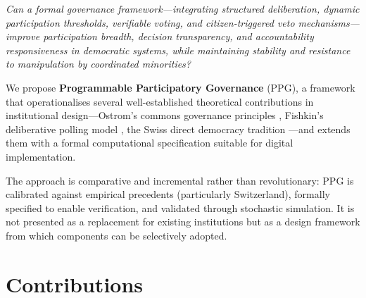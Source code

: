 \documentclass[12pt,a4paper,oneside]{report}
\begin{document}
\begin{mdframed}
\textit{Can a formal governance framework---integrating structured deliberation, dynamic participation thresholds, verifiable voting, and citizen-triggered veto mechanisms---improve participation breadth, decision transparency, and accountability responsiveness in democratic systems, while maintaining stability and resistance to manipulation by coordinated minorities?}
\end{mdframed}

We propose \textbf{Programmable Participatory Governance} (PPG), a framework that operationalises several well-established theoretical contributions in institutional design---Ostrom's commons governance principles \citep{ostrom1990governing}, Fishkin's deliberative polling model \citep{fishkin1991democracy}, the Swiss direct democracy tradition \citep{linder2010swiss}---and extends them with a formal computational specification suitable for digital implementation.

The approach is comparative and incremental rather than revolutionary: PPG is calibrated against empirical precedents (particularly Switzerland), formally specified to enable verification, and validated through stochastic simulation. It is not presented as a replacement for existing institutions but as a design framework from which components can be selectively adopted.

\section{Contributions}
\end{document}
